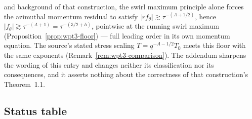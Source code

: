 \documentclass[11pt]{article}
\theoremstyle{definition}
\theoremstyle{remark}
\newcommand{\abs}[1]{\left|#1\right|}
\begin{document}
\begin{enumerate}[label=(\alph*),leftmargin=2.2em]
    and background of that construction, the swirl maximum principle alone
    forces the azimuthal momentum residual to satisfy
    $\abs{rf_\theta}\gtrsim\tau^{-(A+1/2)}$, hence
    $\abs{f_\theta}\gtrsim\tau^{-(A+1)}=\tau^{-(3/2+h)}$, pointwise at the
    running swirl maximum (Proposition~\ref{prop:wpt3-floor}) --- full
    leading order in its own momentum equation. The source's stated stress
    scaling $T=q^{-A-1/2}T_0$ meets this floor with the same exponents
    (Remark~\ref{rem:wpt3-comparison}). The addendum sharpens the wording of
    this entry and changes neither its classification nor its consequences,
    and it asserts nothing about the correctness of that construction's
    Theorem~1.1.
\end{enumerate}

\subsection{Status table}
\label{subsec:walls-table}
\end{document}
